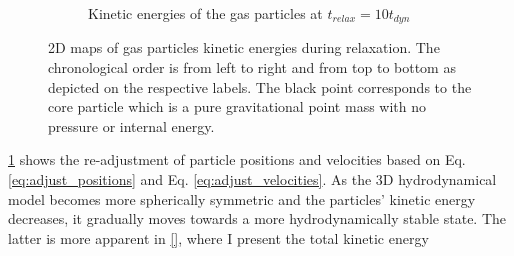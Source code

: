 \begin{figure}[H]
\begin{subfigure}[b]{0.49\textwidth}
        \caption[]%
        {{\small Kinetic energies of the gas particles at  $t_{relax} = 10t_{dyn}$}}
    \end{subfigure}
    \caption{2D maps of gas particles kinetic energies during relaxation.
    The chronological order is from left to right and from top to bottom as depicted on the respective labels. The black point corresponds to the core particle which is a pure gravitational point mass with no pressure or internal energy.}
    \label{fig:kin_energy_maps_relaxation}
\end{figure}

\cref{fig:kin_energy_maps_relaxation} shows the re-adjustment of particle positions and velocities based on Eq. \eqref{eq:adjust_positions} and Eq. \eqref{eq:adjust_velocities}. As the 3D hydrodynamical model becomes more spherically symmetric and the particles' kinetic energy decreases, it gradually moves towards a more hydrodynamically stable state.  The latter is more apparent in \cref{}, where I present the total kinetic energy
